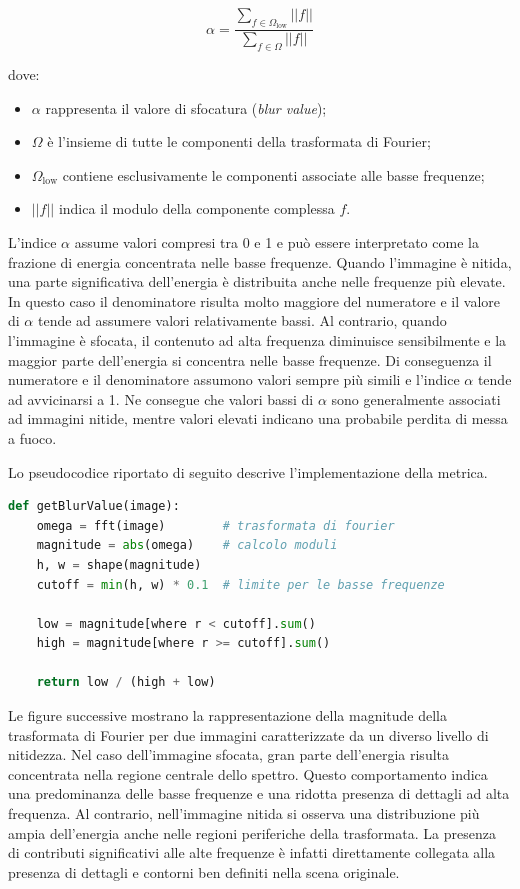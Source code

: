 \documentclass[
    target=bach,
    aauheader=,
    style=
]{thud}
\begin{document}
\begin{equation}
\alpha = \frac{\sum_{f \in \Omega_{\text{low}}} ||f||}{\sum_{f \in \Omega} ||f||}
\end{equation}

dove:

\begin{itemize}
    \item $\alpha$ rappresenta il valore di sfocatura (\textit{blur value});
    \item $\Omega$ è l'insieme di tutte le componenti della trasformata di Fourier;
    \item $\Omega_{\text{low}}$ contiene esclusivamente le componenti associate alle basse frequenze;
    \item $||f||$ indica il modulo della componente complessa $f$.
\end{itemize}

L'indice $\alpha$ assume valori compresi tra 0 e 1 e può essere interpretato come la frazione di energia concentrata nelle basse frequenze. Quando l'immagine è nitida, una parte significativa dell'energia è distribuita anche nelle frequenze più elevate. In questo caso il denominatore risulta molto maggiore del numeratore e il valore di $\alpha$ tende ad assumere valori relativamente bassi. Al contrario, quando l'immagine è sfocata, il contenuto ad alta frequenza diminuisce sensibilmente e la maggior parte dell'energia si concentra nelle basse frequenze. Di conseguenza il numeratore e il denominatore assumono valori sempre più simili e l'indice $\alpha$ tende ad avvicinarsi a 1. Ne consegue che valori bassi di $\alpha$ sono generalmente associati ad immagini nitide, mentre valori elevati indicano una probabile perdita di messa a fuoco.

Lo pseudocodice riportato di seguito descrive l'implementazione della metrica.

\begin{lstlisting}[language=python]
def getBlurValue(image):
    omega = fft(image)        # trasformata di fourier
    magnitude = abs(omega)    # calcolo moduli
    h, w = shape(magnitude)
    cutoff = min(h, w) * 0.1  # limite per le basse frequenze

    low = magnitude[where r < cutoff].sum()
    high = magnitude[where r >= cutoff].sum()

    return low / (high + low)
\end{lstlisting}

Le figure successive mostrano la rappresentazione della magnitude della trasformata di Fourier per due immagini caratterizzate da un diverso livello di nitidezza. Nel caso dell'immagine sfocata, gran parte dell'energia risulta concentrata nella regione centrale dello spettro. Questo comportamento indica una predominanza delle basse frequenze e una ridotta presenza di dettagli ad alta frequenza. Al contrario, nell'immagine nitida si osserva una distribuzione più ampia dell'energia anche nelle regioni periferiche della trasformata. La presenza di contributi significativi alle alte frequenze è infatti direttamente collegata alla presenza di dettagli e contorni ben definiti nella scena originale.
\end{document}
